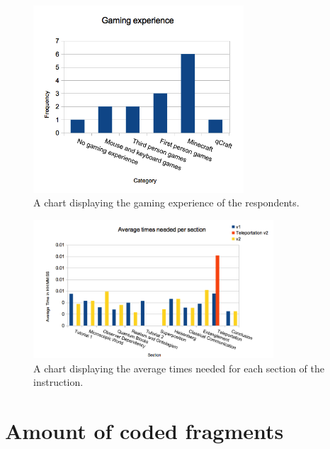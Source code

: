 \documentclass[11pt,twoside]{report} %
\begin{document}
\begin{figure}[htb!]
\centering
\includegraphics[width=0.7\textwidth]{gamingexperiencechart}
\caption{A chart displaying the gaming experience of the respondents.}
\label{fig:gamingexperiencechart}
\end{figure}

\begin{figure}[htb!]
\centering
\includegraphics[width=0.8\textwidth]{timeschart}
\caption{A chart displaying the average times needed for each section of the instruction.}
\label{fig:timeschart}
\end{figure}

\newpage
\FloatBarrier

\chapter{Amount of coded fragments}
\end{document}
